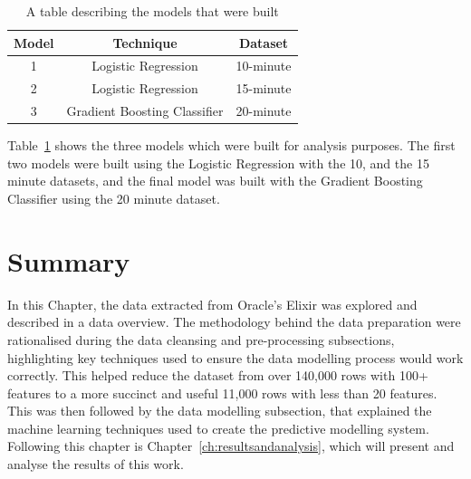 \begin{table}[h!]
\centering
\caption{A table describing the models that were built}
\begin{tabular}{ c c c }
 \hline
 Model & Technique & Dataset \\ [0.5ex]
 \hline
 1 & Logistic Regression & 10-minute \\
 2 & Logistic Regression & 15-minute \\
 3 & Gradient Boosting Classifier & 20-minute \\[1ex]
 \hline
\end{tabular}
\label{tab:ModelsBuilt}
\end{table}

Table~\ref{tab:ModelsBuilt} shows the three models which were built for analysis purposes.
The first two models were built using the Logistic Regression with the 10, and the 15 minute datasets, and the final model was built with the Gradient Boosting Classifier using the 20 minute dataset. \\

\section{Summary}\label{sec:MethodSummary}
In this Chapter, the data extracted from Oracle's Elixir was explored and described in a data overview.
The methodology behind the data preparation were rationalised during the data cleansing and pre-processing subsections, highlighting key techniques used to ensure the data modelling process would work correctly.
This helped reduce the dataset from over 140,000 rows with 100+ features to a more succinct and useful 11,000 rows with less than 20 features.
This was then followed by the data modelling subsection, that explained the machine learning techniques used to create the predictive modelling system.
Following this chapter is Chapter~\ref{ch:resultsandanalysis}, which will present and analyse the results of this work.

